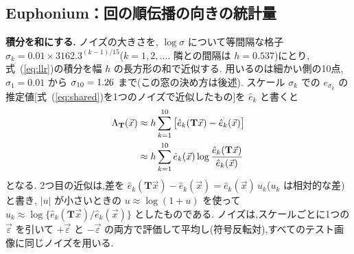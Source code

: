 \documentclass[MIRU,submit,onecolumn]{miru2025j}
\newcommand{\veps}{\vec{\varepsilon}}
\newcommand{\mT}{\mathbf{T}}            %
\renewcommand{\eqref}[1]{(\ref{#1})}   %
\begin{document}
\begin{table}[t]\centering\scriptsize\setlength{\tabcolsep}{4pt}\renewcommand{\arraystretch}{0.88}
\caption{比較手法との比較(AUROC, \%). 左：CIFAR-10を分布内とする9つの自然画像の分布外集合と平均. 右：ほかの5つの分布内での自然画像の分布外集合(順に9, 9, 9, 7, 4集合)の平均. $\dagger$：8つの比較手法の最良. \colorbox{firstblue}{\textbf{水色の太字}}：Oursが比較手法の最良に並ぶか上回る列(0.05ポイント以内は同点). \underline{下線}：最良にだけ下回る列(2位). Ours：式~\eqref{eq:G}のEuphonium. Ablation：PF-ODEによる厳密な $\Lambda_{90}$(印はつけない).}
\label{tab:cifar10}
\end{table}
\subsection{Euphonium：\nfeG{}回の順伝播の向きの統計量}
\label{sec:G}
\textbf{積分を和にする.}
ノイズの大きさを, $\log\sigma$ について等間隔な格子 $\sigma_k=0.01\times3162.3^{(k-1)/15}$($k=1,2,\dots$. 隣との間隔は $h=0.537$)にとり,式~\eqref{eq:llr}の積分を幅 $h$ の長方形の和で近似する. 用いるのは細かい側の10点, $\sigma_1=0.01$ から $\sigma_{10}=1.26$ まで(この窓の決め方は後述). %
スケール $\sigma_k$ での $e_{\sigma_k}$ の推定値[式~\eqref{eq:shared}を1つのノイズで近似したもの]を $\hat e_k$ と書くと
\begin{align}
\Lambda_{\mT}(\vec{x})&\approx h\sum_{k=1}^{10}\big[\hat e_k(\mT\vec{x})-\hat e_k(\vec{x})\big]\notag\\
&\approx h\sum_{k=1}^{10}\hat e_k(\vec{x})\log\frac{\hat e_k(\mT\vec{x})}{\hat e_k(\vec{x})}
\label{eq:disc}
\end{align}
となる. 2つ目の近似は,差を $\hat e_k(\mT\vec{x})-\hat e_k(\vec{x})=\hat e_k(\vec{x})\,u_k$($u_k$ は相対的な差)と書き, $|u|$ が小さいときの $u\approx\log(1+u)$ を使って $u_k\approx\log\{\hat e_k(\mT\vec{x})/\hat e_k(\vec{x})\}$ としたものである. %
ノイズは,スケールごとに1つの $\veps$ を引いて $+\veps$ と $-\veps$ の両方で評価して平均し(符号反転対),すべてのテスト画像に同じノイズを用いる.
\end{document}
